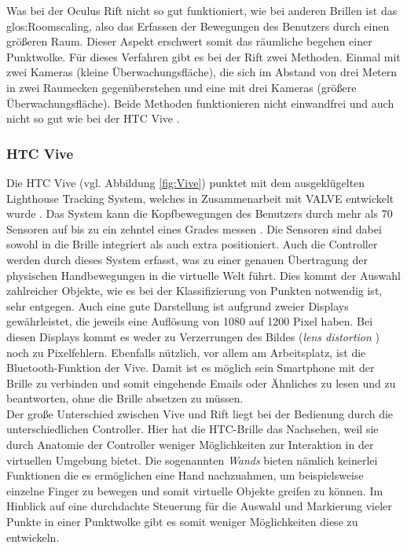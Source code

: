 Was bei der Oculus Rift nicht so gut funktioniert, wie bei anderen Brillen ist das \gls{glos:Roomscaling}, also das Erfassen der Bewegungen des Benutzers durch einen größeren Raum. Dieser Aspekt erschwert somit das räumliche begehen einer Punktwolke. Für dieses Verfahren gibt es bei der Rift zwei Methoden. Einmal mit zwei Kameras (kleine Überwachungsfläche), die sich im Abstand von drei Metern in zwei Raumecken gegenüberstehen und eine mit drei Kameras (größere Überwachungsfläche). Beide Methoden funktionieren nicht einwandfrei und auch nicht so gut wie bei der HTC Vive \cite{bib:OculusTouchTest}.

\subsubsection{HTC Vive}
Die HTC Vive (vgl. Abbildung \ref{fig:Vive}) punktet mit dem ausgeklügelten Lighthouse Tracking System, welches in Zusammenarbeit mit VALVE entwickelt wurde \cite{bib:Lighthouse}. Das System kann die Kopfbewegungen des Benutzers durch mehr als 70 Sensoren auf bis zu ein zehntel eines Grades messen \cite{bib:ViveTest}. Die Sensoren sind dabei sowohl in die Brille integriert als auch extra positioniert. Auch die Controller werden durch dieses System erfasst, was zu einer genauen Übertragung der physischen Handbewegungen in die virtuelle Welt führt. Dies kommt der Auswahl zahlreicher Objekte, wie es bei der Klassifizierung von Punkten notwendig ist, sehr entgegen. Auch eine gute Darstellung ist aufgrund zweier Displays gewährleistet, die jeweils eine Auflösung von 1080 auf 1200 Pixel haben. Bei diesen Displays kommt es weder zu Verzerrungen des Bildes (\textit{\glqq lens distortion\grqq} \cite{bib:ViveTest}) noch zu Pixelfehlern. Ebenfalls nützlich, vor allem am Arbeitsplatz, ist die Bluetooth-Funktion der Vive. Damit ist es möglich sein Smartphone mit der Brille zu verbinden und somit eingehende Emails oder Ähnliches zu lesen und zu beantworten, ohne die Brille absetzen zu müssen.\\  

Der große Unterschied zwischen Vive und Rift liegt bei der Bedienung durch die unterschiedlichen Controller. Hier hat die HTC-Brille das Nachsehen, weil sie durch Anatomie der Controller weniger Möglichkeiten zur Interaktion in der virtuellen Umgebung bietet. Die sogenannten \textit{Wands} bieten nämlich keinerlei Funktionen die es ermöglichen eine Hand nachzuahmen, um beispielsweise einzelne Finger zu bewegen und somit virtuelle Objekte greifen zu können. Im Hinblick auf eine durchdachte Steuerung für die Auswahl und Markierung vieler Punkte in einer Punktwolke gibt es somit weniger Möglichkeiten diese zu entwickeln.

